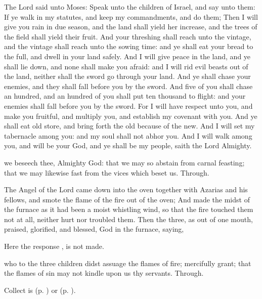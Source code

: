  The Lord said unto Moses: Speak unto the children of Israel, and say unto them: If ye walk in my statutes, and keep my commandments, and do them; Then I will give you rain in due season, and the land shall yield her increase, and the trees of the field shall yield their fruit. And your threshing shall reach unto the vintage, and the vintage shall reach unto the sowing time: and ye shall eat your bread to the full, and dwell in your land safely. And I will give peace in the land, and ye shall lie down, and none shall make you afraid: and I will rid evil beasts out of the land, neither shall the sword go through your land. And ye shall chase your enemies, and they shall fall before you by the sword. And five of you shall chase an hundred, and an hundred of you shall put ten thousand to flight: and your enemies shall fall before you by the sword. For I will have respect unto you, and make you fruitful, and multiply you, and establish my covenant with you. And ye shall eat old store, and bring forth the old because of the new. And I will set my tabernacle among you: and my soul shall not abhor you. And I will walk among you, and will be your God, and ye shall be my people, saith the Lord Almighty.


\collect
{} we beseech thee, Almighty God: that we may so abstain from carnal feasting; that we may likewise fast from the vices which beset us. Through.

 The Angel of the Lord came down into the oven together with Azarias and his fellows, and smote the flame of the fire out of the oven; And made the midst of the furnace as it had been a moist whistling wind, so that the fire touched them not at all, neither hurt nor troubled them. Then the three, as out of one mouth, praised, glorified, and blessed, God in the furnace, saying,
\begin{rubric}
    Here the response , is not made.
\end{rubric}



\collect
{} who to the three children didst assuage the flames of fire; mercifully grant; that the flames of sin may not kindle upon us thy servants. Through.
\begin{rubric}
     Collect is  (p. \pageref{SPAgainst}) or  (p. \pageref{SPChiefBishop}).
\end{rubric}

